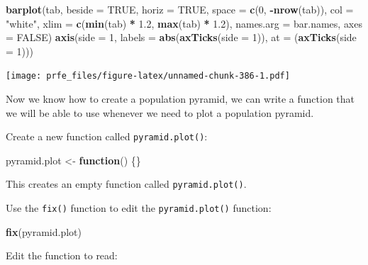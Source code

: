 \documentclass[12pt,a4paper]{book}
\newenvironment{Shaded}{\begin{snugshade}}{\end{snugshade}}
\newcommand{\ControlFlowTok}[1]{\textcolor[rgb]{0.13,0.29,0.53}{\textbf{#1}}}
\newcommand{\DataTypeTok}[1]{\textcolor[rgb]{0.13,0.29,0.53}{#1}}
\newcommand{\DecValTok}[1]{\textcolor[rgb]{0.00,0.00,0.81}{#1}}
\newcommand{\FloatTok}[1]{\textcolor[rgb]{0.00,0.00,0.81}{#1}}
\newcommand{\KeywordTok}[1]{\textcolor[rgb]{0.13,0.29,0.53}{\textbf{#1}}}
\newcommand{\NormalTok}[1]{#1}
\newcommand{\OperatorTok}[1]{\textcolor[rgb]{0.81,0.36,0.00}{\textbf{#1}}}
\newcommand{\OtherTok}[1]{\textcolor[rgb]{0.56,0.35,0.01}{#1}}
\newcommand{\StringTok}[1]{\textcolor[rgb]{0.31,0.60,0.02}{#1}}
\theoremstyle{definition}
\theoremstyle{definition}
\theoremstyle{definition}
\theoremstyle{remark}
\begin{document}
\begin{Shaded}
\begin{Highlighting}[]
\KeywordTok{barplot}\NormalTok{(tab, }\DataTypeTok{beside =} \OtherTok{TRUE}\NormalTok{, }\DataTypeTok{horiz =} \OtherTok{TRUE}\NormalTok{, }\DataTypeTok{space =} \KeywordTok{c}\NormalTok{(}\DecValTok{0}\NormalTok{, }\OperatorTok{-}\KeywordTok{nrow}\NormalTok{(tab)),}
        \DataTypeTok{col =} \StringTok{"white"}\NormalTok{, }\DataTypeTok{xlim =} \KeywordTok{c}\NormalTok{(}\KeywordTok{min}\NormalTok{(tab) }\OperatorTok{*}\StringTok{ }\FloatTok{1.2}\NormalTok{, }\KeywordTok{max}\NormalTok{(tab) }\OperatorTok{*}\StringTok{ }\FloatTok{1.2}\NormalTok{),}
        \DataTypeTok{names.arg =}\NormalTok{ bar.names, }\DataTypeTok{axes =} \OtherTok{FALSE}\NormalTok{)}
\KeywordTok{axis}\NormalTok{(}\DataTypeTok{side =} \DecValTok{1}\NormalTok{,}
     \DataTypeTok{labels =} \KeywordTok{abs}\NormalTok{(}\KeywordTok{axTicks}\NormalTok{(}\DataTypeTok{side =} \DecValTok{1}\NormalTok{)),}
     \DataTypeTok{at =}\NormalTok{ (}\KeywordTok{axTicks}\NormalTok{(}\DataTypeTok{side =} \DecValTok{1}\NormalTok{)))}
\end{Highlighting}
\end{Shaded}

\texttt{[image: prfe\_files/figure-latex/unnamed-chunk-386-1.pdf]}

Now we know how to create a population pyramid, we can write a function
that we will be able to use whenever we need to plot a population
pyramid.

Create a new function called \texttt{pyramid.plot()}:

\begin{Shaded}
\begin{Highlighting}[]
\NormalTok{pyramid.plot <-}\StringTok{ }\ControlFlowTok{function}\NormalTok{() \{\}}
\end{Highlighting}
\end{Shaded}

This creates an empty function called \texttt{pyramid.plot()}.

Use the \texttt{fix()} function to edit the \texttt{pyramid.plot()}
function:

\begin{Shaded}
\begin{Highlighting}[]
\KeywordTok{fix}\NormalTok{(pyramid.plot)}
\end{Highlighting}
\end{Shaded}

Edit the function to read:
\end{document}
